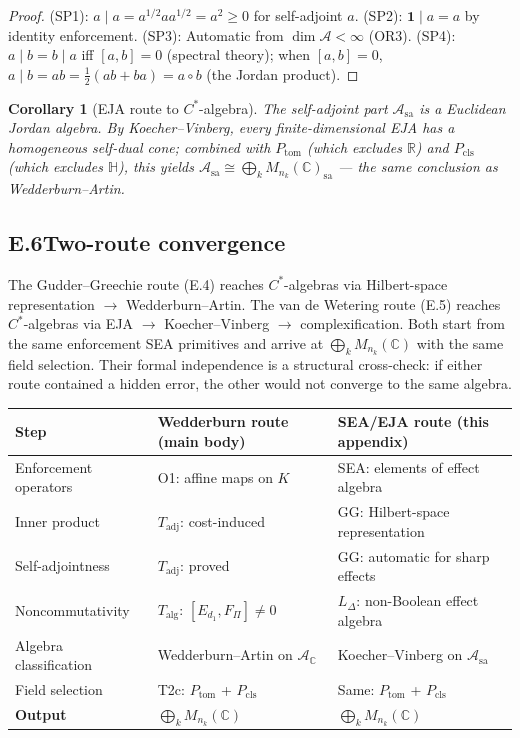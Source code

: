 \documentclass[11pt]{article}
\newtheorem{corollary}[theorem]{Corollary}
\theoremstyle{remark}
\begin{document}
\begin{proof}
(SP1): $a \mid a = a^{1/2}aa^{1/2} = a^2 \ge 0$ for self-adjoint $a$.
(SP2): $\mathbf{1} \mid a = a$ by identity enforcement.
(SP3): Automatic from $\dim \mathcal{A} < \infty$ (OR3).
(SP4): $a \mid b = b \mid a$ iff $[a,b] = 0$ (spectral theory); when $[a,b] = 0$, $a \mid b = ab = \tfrac{1}{2}(ab+ba) = a \circ b$ (the Jordan product).
\end{proof}

\begin{corollary}[EJA route to $C^*$-algebra]\label{cor:EJA}
The self-adjoint part $\mathcal{A}_{\mathrm{sa}}$ is a Euclidean Jordan algebra.  By Koecher--Vinberg, every finite-dimensional EJA has a homogeneous self-dual cone; combined with $P_{\mathrm{tom}}$ (which excludes $\mathbb{R}$) and $P_{\mathrm{cls}}$ (which excludes $\mathbb{H}$), this yields $\mathcal{A}_{\mathrm{sa}} \cong \bigoplus_k M_{n_k}(\mathbb{C})_{\mathrm{sa}}$ --- the same conclusion as Wedderburn--Artin.
\end{corollary}

\subsection*{E.6\quad Two-route convergence}

The Gudder--Greechie route (E.4) reaches $C^*$-algebras via Hilbert-space representation $\to$ Wedderburn--Artin.  The van de Wetering route (E.5) reaches $C^*$-algebras via EJA $\to$ Koecher--Vinberg $\to$ complexification.  Both start from the same enforcement SEA primitives and arrive at $\bigoplus_k M_{n_k}(\mathbb{C})$ with the same field selection.  Their formal independence is a structural cross-check: if either route contained a hidden error, the other would not converge to the same algebra.

\smallskip
\begin{center}
\small
\begin{tabular}{@{}p{3.5cm}p{4.0cm}p{4.5cm}@{}}
\textbf{Step} & \textbf{Wedderburn route (main body)} & \textbf{SEA/EJA route (this appendix)} \\[2pt]
\hline\noalign{\smallskip}
Enforcement operators & O1: affine maps on $K$ & SEA: elements of effect algebra \\[3pt]
Inner product & $T_{\mathrm{adj}}$: cost-induced & GG: Hilbert-space representation \\[3pt]
Self-adjointness & $T_{\mathrm{adj}}$: proved & GG: automatic for sharp effects \\[3pt]
Noncommutativity & $T_{\mathrm{alg}}$: $[E_{d_1}, F_\Pi] \ne 0$ & $L_\Delta$: non-Boolean effect algebra \\[3pt]
Algebra classification & Wedderburn--Artin on $\mathcal{A}_\mathbb{C}$ & Koecher--Vinberg on $\mathcal{A}_{\mathrm{sa}}$ \\[3pt]
Field selection & T2c: $P_{\mathrm{tom}}$ + $P_{\mathrm{cls}}$ & Same: $P_{\mathrm{tom}}$ + $P_{\mathrm{cls}}$ \\[3pt]
\textbf{Output} & $\bigoplus_k M_{n_k}(\mathbb{C})$ & $\bigoplus_k M_{n_k}(\mathbb{C})$ \\
\end{tabular}
\end{center}
\end{document}
